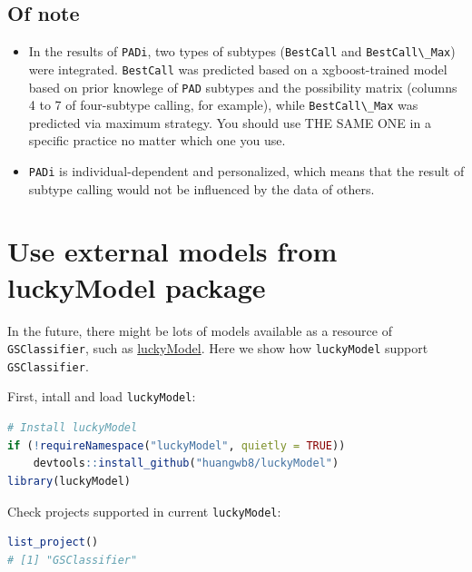 \documentclass[
  12pt,
]{book}
\newcommand{\passthrough}[1]{#1}
\begin{document}
\hypertarget{of-note-1}{%
\subsection{Of note}\label{of-note-1}}

\begin{itemize}
\item
  In the results of \passthrough{\lstinline!PADi!}, two types of subtypes (\passthrough{\lstinline!BestCall!} and \passthrough{\lstinline!BestCall\_Max!}) were integrated. \passthrough{\lstinline!BestCall!} was predicted based on a xgboost-trained model based on prior knowlege of \passthrough{\lstinline!PAD!} subtypes and the possibility matrix (columns 4 to 7 of four-subtype calling, for example), while \passthrough{\lstinline!BestCall\_Max!} was predicted via maximum strategy. You should use THE SAME ONE in a specific practice no matter which one you use.
\item
  \passthrough{\lstinline!PADi!} is individual-dependent and personalized, which means that the result of subtype calling would not be influenced by the data of others.
\end{itemize}

\hypertarget{use-external-models-from-luckymodel-package}{%
\section{Use external models from luckyModel package}\label{use-external-models-from-luckymodel-package}}

In the future, there might be lots of models available as a resource of \passthrough{\lstinline!GSClassifier!}, such as \href{https://github.com/huangwb8/luckyModel}{luckyModel}. Here we show how \passthrough{\lstinline!luckyModel!} support \passthrough{\lstinline!GSClassifier!}.

First, intall and load \passthrough{\lstinline!luckyModel!}:

\begin{lstlisting}[language=R]
# Install luckyModel
if (!requireNamespace("luckyModel", quietly = TRUE))
    devtools::install_github("huangwb8/luckyModel")
library(luckyModel)
\end{lstlisting}

Check projects supported in current \passthrough{\lstinline!luckyModel!}:

\begin{lstlisting}[language=R]
list_project()
# [1] "GSClassifier"
\end{lstlisting}
\end{document}
